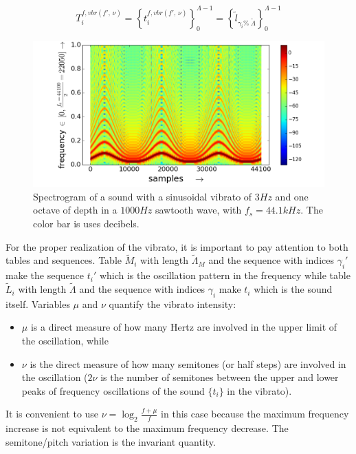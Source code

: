 \begin{equation}\label{vbrT}
 T_i^{f, vbr(f',\,\nu)}=\left\{ t_i^{f,vbr(f',\,\nu)} \right\}_0^{\Lambda-1}=\left\{ \widetilde{l}_{\gamma_i \%\; \widetilde{\Lambda} } \right\}_0^{\Lambda-1}
\end{equation}

\begin{figure}[h!]
     \centering
         \includegraphics[width=\columnwidth]{figures/vibrato_}
     \caption{Spectrogram of a sound with a sinusoidal vibrato of $3Hz$ and one octave of depth in a $1000Hz$ sawtooth wave, with $f_s=44.1kHz$. The color bar is uses decibels.}
         \label{fig:vibrato}
\end{figure}

For the proper realization of the vibrato, it is important to pay attention to both tables and sequences. Table $\widetilde{M}_i$ with length $\widetilde{\Lambda}_M$ and the sequence with indices $\gamma_i'$ make the sequence $t_i'$ which is the oscillation pattern in the frequency while table $\widetilde{L}_i$ with length $\widetilde{\Lambda}$ and the sequence with indices $\gamma_i$ make $t_i$ which is the sound itself. Variables $\mu$ and $\nu$ quantify the vibrato intensity:
\begin{itemize}
    \item $\mu$ is a direct measure of how many Hertz are involved in the upper limit of the oscillation, while
    \item $\nu$ is the direct measure of how many semitones (or half steps) are involved in the oscillation ($2\nu$ is the number of semitones between the upper and lower peaks of frequency oscillations of the sound $\{t_i\}$ in the vibrato).
\end{itemize}

It is convenient to use $\nu=\log_{2}\frac{f+\mu}{f} $ in this case because the maximum frequency increase is not equivalent to the maximum frequency decrease. The semitone/pitch variation is the invariant quantity.

